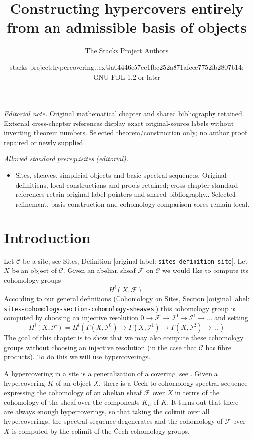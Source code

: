\documentclass[10pt,a4paper]{article}
\title{Constructing hypercovers entirely from an admissible basis of objects}
\author{The Stacks Project Authors}
\date{stacks-project:hypercovering.tex@a04446e57ec1fbc252a871afcec7752fb2807b14; GNU FDL 1.2 or later}
\theoremstyle{plain}
\theoremstyle{definition}
\theoremstyle{remark}
\numberwithin{equation}{subsection}
\begin{document}
\maketitle
\noindent\textit{Editorial note.} Original mathematical chapter and shared bibliography retained. External cross-chapter references display exact original-source labels without inventing theorem numbers. Selected theorem/construction only; no author proof repaired or newly supplied.\par\medskip
\noindent\textit{Allowed standard prerequisites (editorial).}\begin{itemize}
\item Sites, sheaves, simplicial objects and basic spectral sequences. Original definitions, local constructions and proofs retained; cross-chapter standard references retain original label pointers and shared bibliography.. Selected refinement, basis construction and cohomology-comparison cores remain local.
\end{itemize}\medskip
\section{Introduction}
\label{section-introduction}

\noindent
Let $\mathcal{C}$ be a site, see Sites, Definition \textnormal{[original label: \nolinkurl{sites-definition-site}]}.
Let $X$ be an object of $\mathcal{C}$.
Given an abelian sheaf $\mathcal{F}$
on $\mathcal{C}$ we would like to compute
its cohomology groups
$$
H^i(X, \mathcal{F}).
$$
According to our general definitions (Cohomology on Sites, Section
\textnormal{[original label: \nolinkurl{sites-cohomology-section-cohomology-sheaves}]})
this cohomology group is computed by
choosing an injective resolution
$
0 \to \mathcal{F} \to \mathcal{I}^0 \to \mathcal{I}^1 \to \ldots
$
and setting
$$
H^i(X, \mathcal{F})
=
H^i(
\Gamma(X, \mathcal{I}^0) \to
\Gamma(X, \mathcal{I}^1) \to
\Gamma(X, \mathcal{I}^2)\to \ldots)
$$
The goal of this chapter is to show that we may also compute these
cohomology groups without choosing an injective resolution
(in the case that $\mathcal{C}$ has fibre products). To do this
we will use hypercoverings.

\medskip\noindent
A hypercovering in a site is a generalization of a covering, see
\cite[Expos\'e V, Sec. 7]{SGA4}. Given a hypercovering $K$ of an object
$X$, there is a {\v C}ech to cohomology spectral sequence
expressing the cohomology of an abelian sheaf $\mathcal{F}$
over $X$ in terms of the cohomology of the sheaf over the
components $K_n$ of $K$. It turns out that there are always
enough hypercoverings, so that taking the colimit over all hypercoverings,
the spectral sequence degenerates and the cohomology of $\mathcal{F}$
over $X$ is computed by the colimit of the {\v C}ech cohomology groups.
\end{document}

